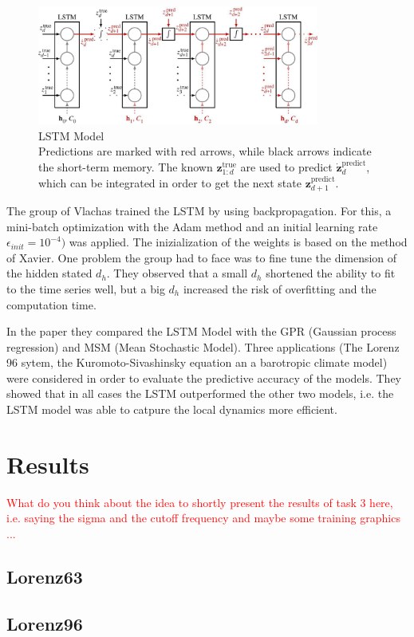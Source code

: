 \documentclass{scrarticle}
\begin{document}
	\begin{figure}
		\includegraphics[width=9.25cm]{images/LSTM_Vlachas.jpg}
		\captionsetup{format=plain}
		\caption{LSTM Model\cite{Vlachas}\\Predictions are marked with red arrows, while black arrows indicate the short-term memory. The known $\bm{z}_{1:d}^{\text{true}}$ are used to predict $\bm{\dot{z}}_d^{\text{predict}}$, which can be integrated in order to get the next state $\bm{z}_{d+1}^{\text{predict}}$.}
	\end{figure}

	The group of Vlachas trained the LSTM by using backpropagation. For this, a mini-batch optimization with the Adam method \cite{Adam} and an initial learning rate $\epsilon_{init}=10^{-4})$ was applied. The inizialization of the weights is based on the method of Xavier. One problem the group had to face was to fine tune the dimension of the hidden stated $d_h$. They observed that a small $d_h$ shortened the ability to fit to the time series well, but a big $d_h$ increased the risk of overfitting and the computation time.
	
	In the paper they compared the LSTM Model with the GPR (Gaussian process regression) and MSM (Mean Stochastic Model). Three applications (The Lorenz 96 sytem, the Kuromoto-Sivashinsky equation an a barotropic climate model) were considered in order to evaluate the predictive accuracy of the models. They showed that in all cases the LSTM outperformed the other two models, i.e. the LSTM model was able to catpure the local dynamics more efficient.
	\section{Results}
	\textcolor{red}{What do you think about the idea to shortly present the results of task 3 here, i.e. saying the sigma and the cutoff frequency and maybe some training graphics ...}
	\subsection{Lorenz63}
	\subsection{Lorenz96}
	
	\printbibliography
\end{document}
